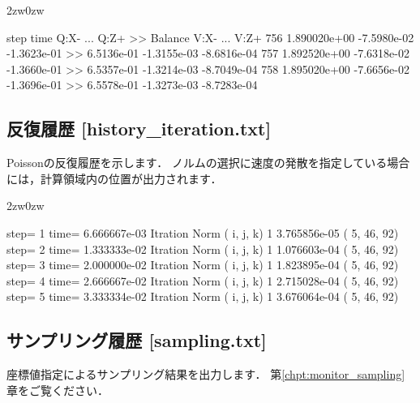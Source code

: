 \begin{indentation}{2zw}{0zw}
{\small
\begin{program}
    step         time         Q:X-   ...      Q:Z+ >>      Balance         V:X-   ...   V:Z+
     756 1.890020e+00  -7.5980e-02     -1.3623e-01 >>   6.5136e-01  -1.3155e-03  -8.6816e-04
     757 1.892520e+00  -7.6318e-02     -1.3660e-01 >>   6.5357e-01  -1.3214e-03  -8.7049e-04
     758 1.895020e+00  -7.6656e-02     -1.3696e-01 >>   6.5578e-01  -1.3273e-03  -8.7283e-04
\end{program}
}
\end{indentation}



%
\pagebreak
\subsection{反復履歴 [history\_iteration.txt]}
Poissonの反復履歴を示します．
ノルムの選択に速度の発散を指定している場合には，計算領域内の位置が出力されます．

\begin{indentation}{2zw}{0zw}
{\small 
\begin{program}
step=               1  time= 6.666667e-03  Itration          Norm (     i,      j,      k)
                                                  1  3.765856e-05 (     5,     46,     92)
step=               2  time= 1.333333e-02  Itration          Norm (     i,      j,      k)
                                                  1  1.076603e-04 (     5,     46,     92)
step=               3  time= 2.000000e-02  Itration          Norm (     i,      j,      k)
                                                  1  1.823895e-04 (     5,     46,     92)
step=               4  time= 2.666667e-02  Itration          Norm (     i,      j,      k)
                                                  1  2.715028e-04 (     5,     46,     92)
step=               5  time= 3.333334e-02  Itration          Norm (     i,      j,      k)
                                                  1  3.676064e-04 (     5,     46,     92)
\end{program}
}
\end{indentation}


%
\pagebreak
\subsection{サンプリング履歴 [sampling.txt]}

座標値指定によるサンプリング結果を出力します．
第\ref{chpt:monitor_sampling}章をご覧ください．



